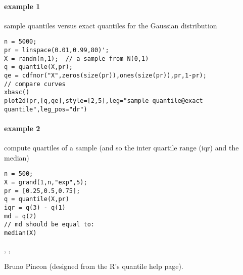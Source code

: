 \begin{examples}
\paragraph{example 1} sample quantiles versus exact quantiles for the Gaussian distribution
\begin{Verbatim}
n = 5000;
pr = linspace(0.01,0.99,80)';
X = randn(n,1);  // a sample from N(0,1)
q = quantile(X,pr);
qe = cdfnor("X",zeros(size(pr)),ones(size(pr)),pr,1-pr);
// compare curves
xbasc()
plot2d(pr,[q,qe],style=[2,5],leg="sample quantile@exact quantile",leg_pos="dr")
\end{Verbatim}

\paragraph{example 2} compute quartiles of a sample (and so the inter quartile range (iqr) and the median)
\begin{Verbatim}
n = 500;
X = grand(1,n,"exp",5);
pr = [0.25,0.5,0.75];
q = quantile(X,pr)
iqr = q(3) - q(1)
md = q(2)
// md should be equal to:
median(X)
\end{Verbatim}

\end{examples}

\begin{manseealso}
   , , 
\end{manseealso}

\begin{authors}
  Bruno Pincon (designed from the R's quantile help page).
\end{authors}
